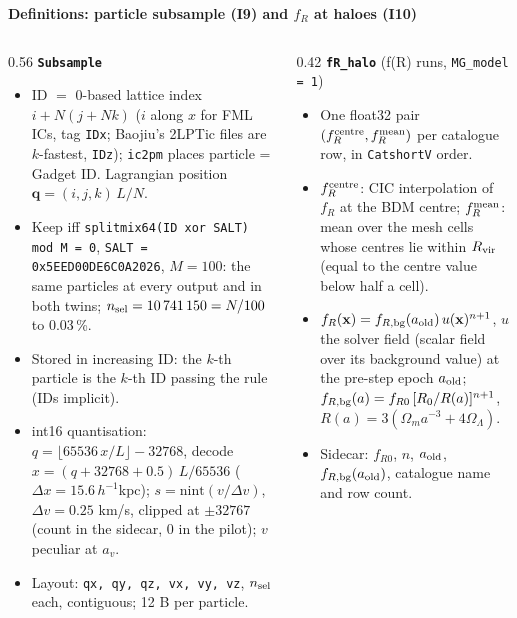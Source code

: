 \documentclass[UTF8]{beamer}
\begin{document}
\begin{frame}{\textbf{Definitions: particle subsample (I9) and $f_R$ at haloes (I10)}}
  \scriptsize
  \begin{columns}[T]
    \begin{column}{0.56\textwidth}
      \textbf{\texttt{Subsample}}
      \begin{itemize}
        \item ID $=$ 0-based lattice index $i + N(j + Nk)$ ($i$ along $x$ for FML ICs, tag \texttt{IDx}; Baojiu's 2LPTic
          files are $k$-fastest, \texttt{IDz}); \texttt{ic2pm} places particle = Gadget ID. Lagrangian position
          $\mathbf{q} = (i, j, k)\,L/N$.
        \item Keep iff \texttt{splitmix64(ID xor SALT) mod M = 0}, \texttt{SALT = 0x5EED00DE6C0A2026}, $M = 100$:
          the same particles at every output and in both twins; $n_{\rm sel} = 10\,741\,150 = N/100$ to 0.03\,\%.
        \item Stored in increasing ID: the $k$-th particle is the $k$-th ID passing the rule (IDs implicit).
        \item int16 quantisation: $q = \lfloor 65536\,x/L\rfloor - 32768$, decode $x = (q + 32768 + 0.5)\,L/65536$
          ($\Delta x = 15.6\,h^{-1}$kpc); $s = \mathrm{nint}(v/\Delta v)$, $\Delta v = 0.25$ km/s, clipped at
          $\pm32767$ (count in the sidecar, 0 in the pilot); $v$ peculiar at $a_v$.
        \item Layout: \texttt{qx, qy, qz, vx, vy, vz}, $n_{\rm sel}$ each, contiguous; 12 B per particle.
      \end{itemize}
    \end{column}
    \begin{column}{0.42\textwidth}
      \textbf{\texttt{fR\_halo}} (f(R) runs, \texttt{MG\_model = 1})
      \begin{itemize}
        \item One float32 pair $(f_R^{\rm centre}, f_R^{\rm mean})$ per catalogue row, in \texttt{CatshortV} order.
        \item $f_R^{\rm centre}$: CIC interpolation of $f_R$ at the BDM centre; $f_R^{\rm mean}$: mean over the mesh cells
          whose centres lie within $R_{\rm vir}$ (equal to the centre value below half a cell).
        \item $f_R(\mathbf{x}) = f_{R,\rm bg}(a_{\rm old})\,u(\mathbf{x})^{n+1}$, $u$ the solver field (scalar field over its
          background value) at the pre-step epoch $a_{\rm old}$;
          $f_{R,\rm bg}(a) = f_{R0}\,[R_0/R(a)]^{n+1}$, $R(a) = 3(\Omega_m a^{-3} + 4\Omega_\Lambda)$.
        \item Sidecar: $f_{R0}$, $n$, $a_{\rm old}$, $f_{R,\rm bg}(a_{\rm old})$, catalogue name and row count.
      \end{itemize}
    \end{column}
  \end{columns}
\end{frame}
\end{document}
